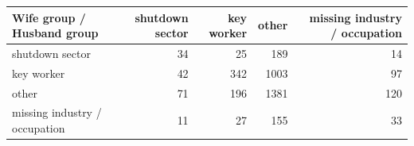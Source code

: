 
\begin{tabular}{lrrrr}
\toprule
Wife group / Husband group & shutdown sector & key worker & other & missing industry / occupation\\
\midrule
shutdown sector & 34 & 25 & 189 & 14\\
key worker & 42 & 342 & 1003 & 97\\
other & 71 & 196 & 1381 & 120\\
missing industry / occupation & 11 & 27 & 155 & 33\\
\bottomrule
\end{tabular}

